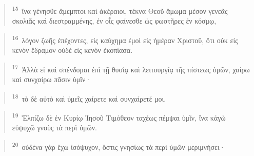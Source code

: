 \documentclass{article}
\newcommand{\currentverse}{1} %
\newcommand{\setcurrentverse}[1]{\renewcommand{\currentverse}{#1}}
\begin{document}
\begin{verse}

\setcurrentverse{15}

\setcounter{footnote}{0}

\textsuperscript{15}~ἵνα γένησθε ἄμεμπτοι καὶ ἀκέραιοι, τέκνα Θεοῦ ἄμωμα μέσον γενεᾶς σκολιᾶς καὶ διεστραμμένης, ἐν οἷς φαίνεσθε ὡς φωστῆρες ἐν κόσμῳ,

\end{verse}

\begin{verse}

\setcurrentverse{16}

\setcounter{footnote}{0}

\textsuperscript{16}~λόγον ζωῆς ἐπέχοντες, εἰς καύχημα ἐμοὶ εἰς ἡμέραν Χριστοῦ, ὅτι οὐκ εἰς κενὸν ἔδραμον οὐδὲ εἰς κενὸν ἐκοπίασα.

\end{verse}

\begin{verse}

\setcurrentverse{17}

\setcounter{footnote}{0}

\textsuperscript{17}~Ἀλλὰ εἰ καὶ σπένδομαι ἐπὶ τῇ θυσίᾳ καὶ λειτουργίᾳ τῆς πίστεως ὑμῶν, χαίρω καὶ συνχαίρω πᾶσιν ὑμῖν·

\end{verse}

\begin{verse}

\setcurrentverse{18}

\setcounter{footnote}{0}

\textsuperscript{18}~τὸ δὲ αὐτὸ καὶ ὑμεῖς χαίρετε καὶ συνχαίρετέ μοι.

\end{verse}

\begin{verse}

\setcurrentverse{19}

\setcounter{footnote}{0}

\textsuperscript{19}~Ἐλπίζω δὲ ἐν Κυρίῳ Ἰησοῦ Τιμόθεον ταχέως πέμψαι ὑμῖν, ἵνα κἀγὼ εὐψυχῶ γνοὺς τὰ περὶ ὑμῶν.

\end{verse}

\begin{verse}

\setcurrentverse{20}

\setcounter{footnote}{0}

\textsuperscript{20}~οὐδένα γὰρ ἔχω ἰσόψυχον, ὅστις γνησίως τὰ περὶ ὑμῶν μεριμνήσει·

\end{verse}
\end{document}
